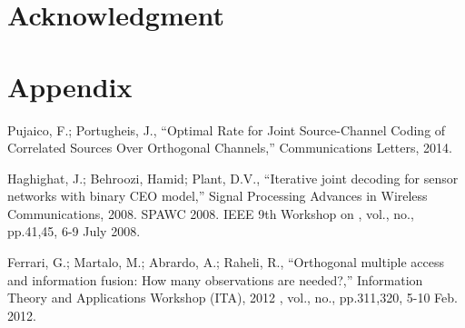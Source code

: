 \documentclass[journal]{IEEEtran}
\begin{document}
\section*{Acknowledgment}


\section{Appendix} \label{sec:Appendix}

\begin{thebibliography}{99}

 Pujaico, F.; Portugheis, J.,
``Optimal Rate for Joint Source-Channel Coding of Correlated Sources Over 
Orthogonal Channels,'' Communications Letters, 2014.

 Haghighat, J.; Behroozi, Hamid; Plant, D.V., 
``Iterative joint decoding for sensor networks with binary CEO model,'' 
Signal Processing Advances in Wireless Communications, 2008. SPAWC 2008. 
IEEE 9th Workshop on , vol., no., pp.41,45, 6-9 July 2008.

 Ferrari, G.; Martalo, M.; Abrardo, A.; Raheli, R., 
``Orthogonal multiple access and information fusion: How many observations are needed?,'' 
Information Theory and Applications Workshop (ITA), 2012 , vol., no., pp.311,320, 5-10 Feb. 2012.


\end{thebibliography}
\end{document}
